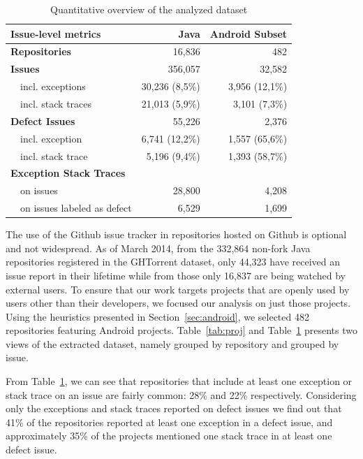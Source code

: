 \documentclass[conference]{IEEEtran}
\begin{document}
\begin{table}
\centering
\begin{tabular}{p{1em}lrr}
\hline
\multicolumn{2}{l}{\bfseries{Issue-level metrics}} & \bfseries{Java} & \bfseries{Android Subset}\\
\hline
   \multicolumn{2}{l}{\bfseries{Repositories}} & 16,836 & 482\\
 \multicolumn{2}{l}{\bfseries{Issues}} & 356,057 & 32,582\\
    & incl. exceptions & 30,236 (8,5\%) & 3,956 (12,1\%) \\
    & incl. stack traces & 21,013 (5,9\%) & 3,101 (7,3\%) \\
 \multicolumn{2}{l}{\bfseries{Defect Issues}} & 55,226 & 2,376 \\
    & incl. exception & 6,741 (12,2\%) & 1,557 (65,6\%) \\
    & incl. stack trace &  5,196 (9,4\%) & 1,393 (58,7\%)\\
\multicolumn{2}{l}{\bfseries{Exception Stack Traces}} &  & \\
    & on issues  & 28,800 & 4,208  \\
    & on issues labeled as defect & 6,529 & 1,699 \\
\hline
\end{tabular}
\caption{Quantitative overview of the analyzed dataset}
\label{tab:overview}
\end{table}

The use of the Github issue tracker in repositories hosted on Github is optional
and not widespread. As of March 2014, from the 332,864 non-fork Java
repositories registered in the GHTorrent dataset, only 44,323 have received an
issue report in their lifetime while from those only 16,837 are being watched by
external users. To ensure that our work targets projects that are openly used by
users other than their developers, we focused our analysis on just those
projects. Using the heuristics presented in Section~\ref{sec:android}, we
selected 482 repositories featuring Android projects. Table~\ref{tab:proj} and
Table~\ref{tab:overview} presents two views of the extracted dataset, namely
grouped by repository and grouped by issue.

From Table~\ref{tab:overview}, we can see that repositories that include at
least one exception or stack trace on an issue are fairly common: 28\% and 22\%
respectively. Considering only the exceptions and stack traces reported on
defect issues we find out that 41\% of the repositories reported at least one
exception in a defect issue, and approximately 35\% of the projects mentioned
one stack trace in at least one defect issue.
\end{document}
